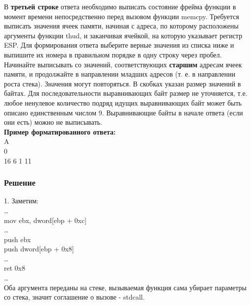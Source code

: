 \documentclass[12pt, letterpaper]{article}
\begin{document}
В \textbf{третьей строке} ответа необходимо выписать состояние фрейма функции в момент времени непосредственно перед вызовом функции memcpy. Требуется выписать значения ячеек памяти, начиная с адреса, по которому расположены аргументы функции thud, и заканчивая ячейкой, на которую указывает регистр ESP. Для формирования ответа выберите верные значения из списка ниже и выпишите их номера в правильном порядке в одну строку через пробел. Начинайте выписывать со значений, соответствующих \textbf{старшим} адресам ячеек памяти, и продолжайте в направлении младших адресов (т. е. в направлении роста стека). Значения могут повторяться. В скобках указан размер значений в байтах. Для последовательности выравнивающих байт размер не уточняется, т.е. любое ненулевое количество подряд идущих выравнивающих байт может быть описано единственным числом 9. Выравнивающие байты в начале ответа (если они есть) можно не выписывать.\\

\textbf{Пример форматированного ответа:}\\
A\\
0\\
16 6 1 11\\
\begin{center}
\end{center}
\vspace{2cm}
\subsubsection{Решение}
1. Заметим:\\
\dots\\
mov ebx, dword[ebp + 0xc]\\
\dots\\
push ebx\\
push dword[ebp + 0x8]\\
\dots\\
ret 0x8\\
\dots\\
Оба аргумента переданы на стеке, вызываемая функция сама убирает параметры со стека, значит соглашение о вызове - stdcall.\\
\end{document}
